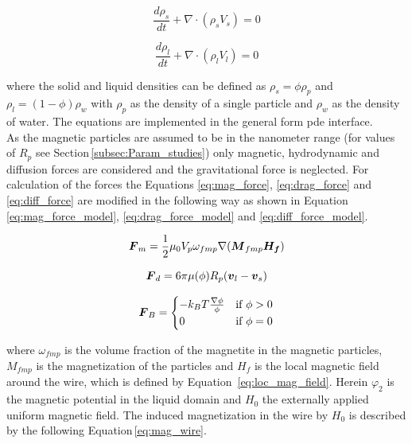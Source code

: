 \begin{equation}
\frac{d\rho_{s}}{d t}+\nabla\cdotp(\rho_{s}V_{s})=0
\label{eq:Conti_p}
\end{equation}

\begin{equation}
\frac{d\rho_{l}}{d t}+\nabla\cdotp(\rho_{l}V_{l})=0
\label{eq:Conti_l}
\end{equation}

where the solid and liquid densities can be defined as $\rho_{s}=\phi\rho_{p}$ and $\rho_{l}=(1-\phi)\rho_{w}$ with $\rho_{p}$ as the density of a single particle and $\rho_{w}$ as the density of water. The equations are implemented in the general form \gls{pde} interface.\\
As the magnetic particles are assumed to be in the nanometer range (for values of $R_{p}$ see Section\,\ref{subsec:Param_studies}) only magnetic, hydrodynamic and diffusion forces are considered and the gravitational force is neglected. For calculation of the forces the Equations \ref{eq:mag_force}, \ref{eq:drag_force} and \ref{eq:diff_force} are modified in the following way as shown in Equation\, \ref{eq:mag_force_model}, \ref{eq:drag_force_model} and \ref{eq:diff_force_model}.  

\begin{equation}
\label{eq:mag_force_model}
\centering
\boldsymbol{F}_{m} = \frac{1}{2}\mu_{0}V_{p}\omega_{fmp}\nabla(\boldsymbol{M}_{fmp}\boldsymbol{H_{f}})
\end{equation}

\begin{equation}
\label{eq:drag_force_model}
\centering
\boldsymbol{F}_{d} = 6\pi\mu(\phi)R_{p}(\boldsymbol{v}_{l}-\boldsymbol{v}_{s})
\end{equation}

\begin{equation}
\label{eq:diff_force_model}
\centering
\boldsymbol{F}_{B}= 
                 \begin{cases}
                    -k_{B}T\frac{\nabla\phi}{\phi} & \text{if}\ \phi>0 \\
                    0 & \text{if}\ \phi=0
                 \end{cases}
\end{equation}

where $\omega_{fmp}$ is the volume fraction of the magnetite in the magnetic particles, $M_{fmp}$ is the magnetization of the particles and $H_{f}$ is the local magnetic field around the wire, which is defined by Equation\, \ref{eq:loc_mag_field}. Herein $\varphi_{2}$ is the magnetic potential in the liquid domain and $H_{0}$ the externally applied uniform magnetic field. The induced magnetization in the wire  by $H_{0}$ is described by the following Equation\,\ref{eq:mag_wire}.

